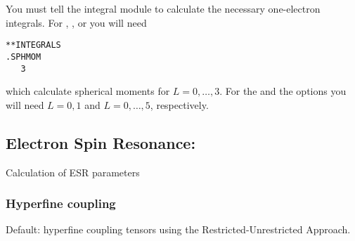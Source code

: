 
You must tell the integral module to calculate the necessary one-electron integrals.
For , , or  you will need

\begin{verbatim}
**INTEGRALS
.SPHMOM
   3
\end{verbatim}

which calculate spherical moments for $L = 0, \ldots, 3$.
For the  and the  options
you will need $L = 0, 1$ and $L = 0, \ldots, 5$, respectively.

\subsection{Electron Spin Resonance: }

Calculation of ESR parameters

\subsubsection{Hyperfine coupling}

Default: hyperfine coupling tensors using 
the Restricted-Unrestricted Approach.

